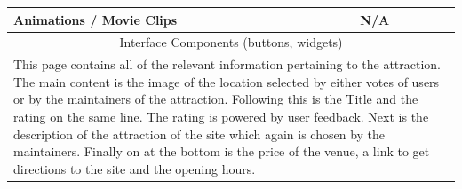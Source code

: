 \begin{tabular}{p{4cm}p{10cm}}
		\hline
		Animations / Movie Clips & N/A \\
		\hline
		\multicolumn{2}{c}{Interface Components (buttons, widgets)} \\
		\hline
		\multicolumn{2}{p{14cm}}{This page contains all of the relevant information pertaining to the attraction. The main content is the image of the location selected by either votes of users or by the maintainers of the attraction. Following this is the Title and the rating on the same line. The rating is powered by user feedback. Next is the description of the attraction of the site which again is chosen by the maintainers. Finally on at the bottom is the price of the venue, a link to get directions to the site and the opening hours.} \\
		\hline
	\end{tabular}
